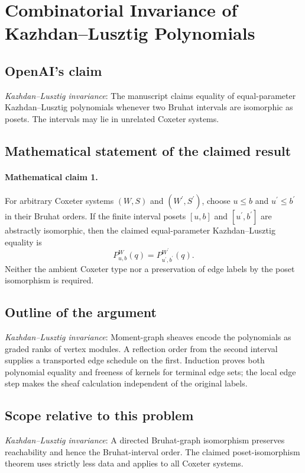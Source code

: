 \documentclass[11pt]{article}
\begin{document}
\section*{Combinatorial Invariance of Kazhdan–Lusztig Polynomials}

\subsection{OpenAI's claim}
\textit{Kazhdan--Lusztig invariance}: The manuscript claims equality of equal-parameter Kazhdan--Lusztig polynomials whenever two Bruhat intervals are isomorphic as posets. The intervals may lie in unrelated Coxeter systems.

\subsection{Mathematical statement of the claimed result}
\paragraph{Mathematical claim 1.} For arbitrary Coxeter systems $(W,S)$ and $(W^\prime,S^\prime)$, choose $u\le b$ and $u^\prime\le b^\prime$ in their Bruhat orders. If the finite interval posets $[u,b]$ and $[u^\prime,b^\prime]$ are abstractly isomorphic, then the claimed equal-parameter Kazhdan--Lusztig equality is \[P^W_{u,b}(q)=P^{W^\prime}_{u^\prime,b^\prime}(q).\] Neither the ambient Coxeter type nor a preservation of edge labels by the poset isomorphism is required.

\subsection{Outline of the argument}
\textit{Kazhdan--Lusztig invariance}: Moment-graph sheaves encode the polynomials as graded ranks of vertex modules. A reflection order from the second interval supplies a transported edge schedule on the first. Induction proves both polynomial equality and freeness of kernels for terminal edge sets; the local edge step makes the sheaf calculation independent of the original labels.

\subsection{Scope relative to this problem}
\textit{Kazhdan--Lusztig invariance}: A directed Bruhat-graph isomorphism preserves reachability and hence the Bruhat-interval order. The claimed poset-isomorphism theorem uses strictly less data and applies to all Coxeter systems.
\end{document}
